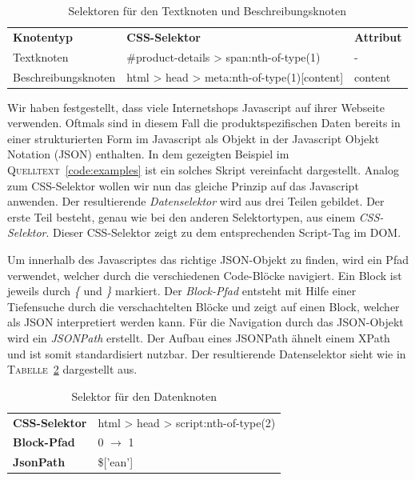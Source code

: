 \begin{table}[h]
    \centering
    \begin{tabular}{ l l l}
        \textbf{Knotentyp}   &   \textbf{CSS-Selektor}    &   \textbf{Attribut} \\
        Textknoten  &   \#product-details > span:nth-of-type(1) & - \\
        Beschreibungsknoten &   html > head > meta:nth-of-type(1)[content]  & content
    \end{tabular}
    \caption{Selektoren für den  Textknoten und  Beschreibungsknoten}
    \label{tab:textselektor-und-beschreibungsselektor}
\end{table}

Wir haben festgestellt, dass viele Internetshops Javascript auf ihrer Webseite verwenden.
Oftmals sind in diesem Fall die produktspezifischen Daten bereits in einer strukturierten Form im Javascript
als Objekt in der Javascript Objekt Notation (JSON) enthalten.
In dem gezeigten Beispiel im \textsc{Quelltext}~\ref{code:examples} ist ein solches Skript vereinfacht dargestellt.
Analog zum CSS-Selektor wollen wir nun das gleiche Prinzip auf das Javascript anwenden.
Der resultierende \textit{Datenselektor} wird aus drei Teilen gebildet.
Der erste Teil besteht, genau wie bei den anderen Selektortypen, aus einem \textit{CSS-Selektor}.
Dieser CSS-Selektor zeigt zu dem entsprechenden Script-Tag im DOM\@.

Um innerhalb des Javascriptes das richtige JSON-Objekt zu finden, wird ein Pfad verwendet, welcher durch die
verschiedenen Code-Blöcke navigiert.
Ein Block ist jeweils durch \textit{\{} und \textit{\}} markiert.
Der \textit{Block-Pfad} entsteht mit Hilfe einer Tiefensuche durch die verschachtelten Blöcke und zeigt auf einen
Block, welcher als JSON interpretiert werden kann.
Für die Navigation durch das JSON-Objekt wird ein \textit{JSONPath} erstellt.
Der Aufbau eines JSONPath ähnelt einem XPath und ist somit standardisiert nutzbar.
Der resultierende Datenselektor sieht wie in \textsc{Tabelle}~\ref{tab:datenselektor} dargestellt aus.

\begin{table}[h]
    \centering
    \begin{tabular}{ l l }
        \textbf{CSS-Selektor} &  html > head > script:nth-of-type(2)\\
        \textbf{Block-Pfad}   &  0 $\rightarrow$ 1\\
        \textbf{JsonPath}     &  \$['ean']
    \end{tabular}
    \caption{Selektor für den  Datenknoten}
    \label{tab:datenselektor}
\end{table}

